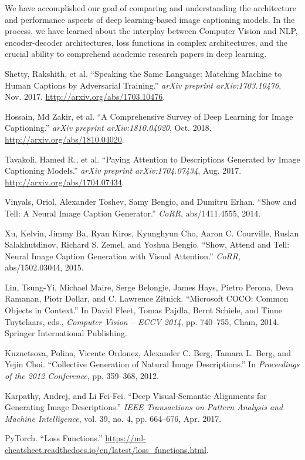 \documentclass{article}
\begin{document}
We have accomplished our goal of comparing and understanding the architecture and performance aspects of deep learning-based image captioning models. In the process, we have learned about the interplay between Computer Vision and NLP, encoder-decoder architectures, loss functions in complex architectures, and the crucial ability to comprehend academic research papers in deep learning.

\begin{thebibliography}{9}

Shetty, Rakshith, et al. “Speaking the Same Language: Matching Machine to Human Captions by Adversarial Training.” \textit{arXiv preprint arXiv:1703.10476}, Nov. 2017. \url{http://arxiv.org/abs/1703.10476}.

Hossain, Md Zakir, et al. “A Comprehensive Survey of Deep Learning for Image Captioning.” \textit{arXiv preprint arXiv:1810.04020}, Oct. 2018. \url{http://arxiv.org/abs/1810.04020}.

Tavakoli, Hamed R., et al. “Paying Attention to Descriptions Generated by Image Captioning Models.” \textit{arXiv preprint arXiv:1704.07434}, Aug. 2017. \url{http://arxiv.org/abs/1704.07434}.

Vinyals, Oriol, Alexander Toshev, Samy Bengio, and Dumitru Erhan. “Show and Tell: A Neural Image Caption Generator.” \textit{CoRR}, abs/1411.4555, 2014.

Xu, Kelvin, Jimmy Ba, Ryan Kiros, Kyunghyun Cho, Aaron C. Courville, Ruslan Salakhutdinov, Richard S. Zemel, and Yoshua Bengio. “Show, Attend and Tell: Neural Image Caption Generation with Visual Attention.” \textit{CoRR}, abs/1502.03044, 2015.

Lin, Tsung-Yi, Michael Maire, Serge Belongie, James Hays, Pietro Perona, Deva Ramanan, Piotr Dollar, and C. Lawrence Zitnick. “Microsoft COCO: Common Objects in Context.” In David Fleet, Tomas Pajdla, Bernt Schiele, and Tinne Tuytelaars, eds., \textit{Computer Vision – ECCV 2014}, pp. 740–755, Cham, 2014. Springer International Publishing.

Kuznetsova, Polina, Vicente Ordonez, Alexander C. Berg, Tamara L. Berg, and Yejin Choi. “Collective Generation of Natural Image Descriptions.” In \textit{Proceedings of the 2012 Conference}, pp. 359–368, 2012.

Karpathy, Andrej, and Li Fei-Fei. “Deep Visual-Semantic Alignments for Generating Image Descriptions.” \textit{IEEE Transactions on Pattern Analysis and Machine Intelligence}, vol. 39, no. 4, pp. 664–676, Apr. 2017.

PyTorch. “Loss Functions.” \url{https://ml-cheatsheet.readthedocs.io/en/latest/loss_functions.html}.

\end{thebibliography}
\end{document}
